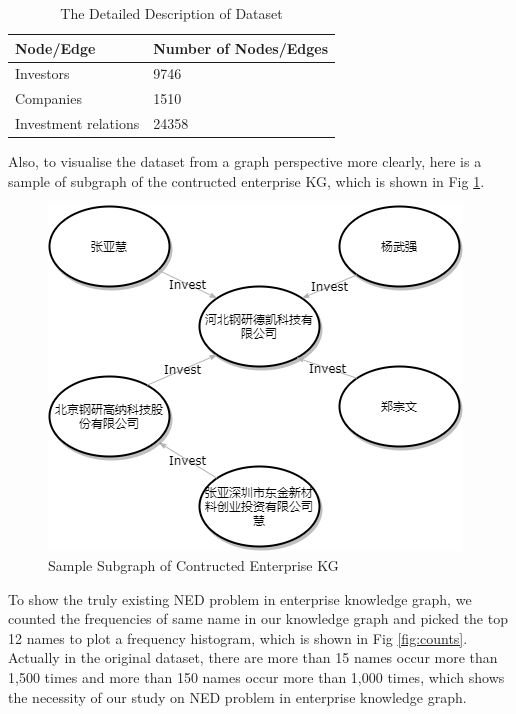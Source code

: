 \documentclass[sigconf, nonacm]{acmart}
\begin{document}
\begin{table}[h!]
\begin{tabular}{@{}ll@{}}
\toprule
Node/Edge            & Number of Nodes/Edges                   \\ \midrule
Investors            &          9746                           \\
Companies            &          1510                           \\
Investment relations &           24358                        \\ \bottomrule
\end{tabular}
\caption{The Detailed Description of Dataset}
\label{description}
\end{table}

Also, to visualise the dataset from a graph perspective more clearly, here is a sample of subgraph of the contructed enterprise KG, which is shown in Fig \ref{fig:sample}. 
\begin{figure}[htbp]
    \centering
    \includegraphics[scale = 0.4]{figures/sample.png}
    \caption{Sample Subgraph of Contructed Enterprise KG}
    \label{fig:sample}
\end{figure}

To show the truly existing NED problem in enterprise knowledge graph, we counted the frequencies of same name in our knowledge graph and picked the top 12 names to plot a frequency histogram, which is shown in Fig \ref{fig:counts}. Actually in the original dataset, there are more than 15 names occur more than 1,500 times and more than 150 names occur more than 1,000 times, which shows the necessity of our study on NED problem in enterprise knowledge graph.
\end{document}
